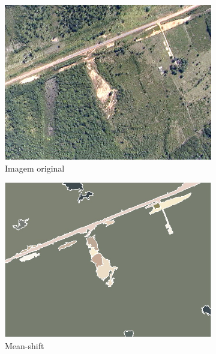 \begin{figure}[htb]
	\centering
	\begin{minipage}[l]{0.51\linewidth}
		\begin{subfigure}[b]{\linewidth}
			\includegraphics[width=\linewidth]{imgs/seg_original}
			\caption{Imagem original}
		\end{subfigure}%
	\end{minipage}
	\begin{minipage}[r]{0.48\linewidth}
		\begin{subfigure}{.47\linewidth}
			\includegraphics[width=\linewidth]{imgs/seg_meanshift}
			\caption{Mean-shift}
		\end{subfigure}
		\begin{subfigure}{.47\linewidth}

\end{subfigure}
\end{minipage}
\end{figure}
